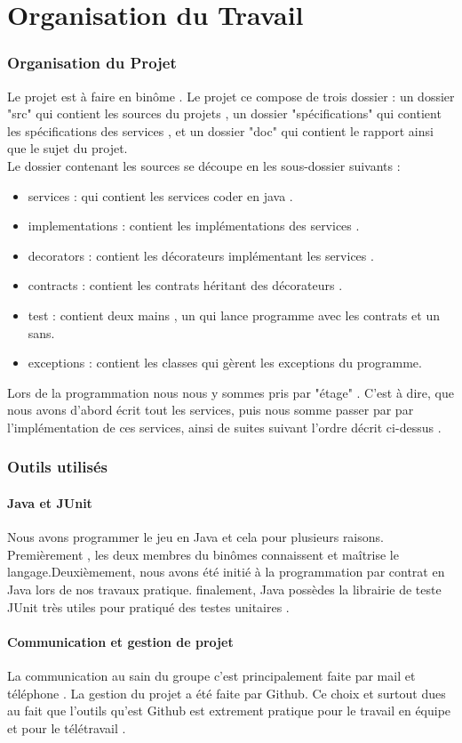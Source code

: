 \part{Organisation du Travail}

\section{Organisation du Projet}
Le projet est à  faire en binôme . Le projet ce compose de trois dossier : un dossier "src" qui contient les sources du projets , un dossier "spécifications"  qui contient les spécifications des services , et un dossier "doc" qui contient le rapport ainsi que le sujet du projet.\\
 Le dossier contenant les sources se découpe en les sous-dossier suivants : 
 	\begin{itemize}
 	\item services : qui contient les services coder en java .
 	\item implementations : contient les implémentations  des services .
 	\item decorators : contient les décorateurs implémentant les services .
 	\item contracts : contient les contrats héritant des décorateurs .
 	\item test : contient deux mains , un qui lance programme avec les contrats et un sans.
 	\item exceptions : contient les classes qui gèrent les exceptions du programme.
 	\end{itemize}
 	
 	Lors de la programmation nous nous y sommes pris par "étage" . C'est à dire, que nous avons d'abord écrit tout les services, puis  nous somme passer par par l’implémentation de ces services, ainsi de suites suivant l'ordre décrit ci-dessus .
 	

\section{Outils utilisés}

\subsection{Java et JUnit}
Nous avons programmer le jeu en Java et cela pour plusieurs raisons. Premièrement , les deux membres du binômes connaissent et maîtrise le langage.Deuxièmement,  nous avons été initié à la programmation par contrat en Java lors de nos travaux pratique. finalement, Java possèdes la librairie de teste JUnit très utiles pour pratiqué des testes unitaires .

\subsection{Communication et gestion de projet}
La communication au sain du groupe c'est principalement faite par mail et téléphone . La gestion du projet a été faite par Github. Ce choix et surtout dues au fait que l'outils qu'est Github est extrement pratique pour le travail en équipe et pour le télétravail .


